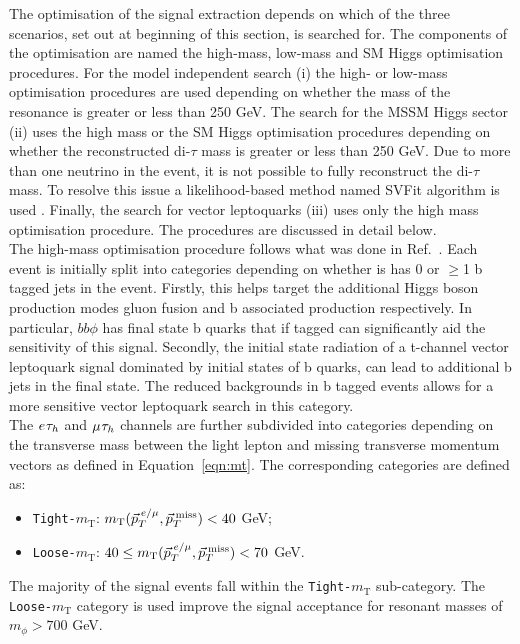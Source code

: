The optimisation of the signal extraction depends on which of the three scenarios, set out at beginning of this section, is searched for.
The components of the optimisation are named the high-mass, low-mass and SM Higgs optimisation procedures.
For the model independent search (i) the high- or low-mass optimisation procedures are used depending on whether the mass of the resonance is greater or less than 250 GeV.
The search for the MSSM Higgs sector (ii) uses the high mass or the SM Higgs optimisation procedures depending on whether the reconstructed di-$\tau$ mass is greater or less than 250 GeV.
Due to more than one neutrino in the event, it is not possible to fully reconstruct the di-$\tau$ mass.
To resolve this issue a likelihood-based method named SVFit algorithm is used \cite{Bianchini:2014vza}.
Finally, the search for vector leptoquarks (iii) uses only the high mass optimisation procedure.
The procedures are discussed in detail below. \\

The high-mass optimisation procedure follows what was done in Ref.~\cite{CMS_MSSM_Tau_2018}.
Each event is initially split into categories depending on whether is has 0 or $\geq$1 b tagged jets in the event.
Firstly, this helps target the additional Higgs boson production modes gluon fusion and b associated production respectively.
In particular, $bb\phi$ has final state b quarks that if tagged can significantly aid the sensitivity of this signal.
Secondly, the initial state radiation of a t-channel vector leptoquark signal dominated by initial states of b quarks, can lead to additional b jets in the final state.
The reduced backgrounds in b tagged events allows for a more sensitive vector leptoquark search in this category. \\

The $e_{}\tau_{h}$ and $\mu_{}\tau_{h}$ channels are further subdivided into categories depending on the transverse mass between the light lepton and missing transverse momentum vectors as defined in Equation~\ref{eqn:mt}.
The corresponding categories are defined as:
\begin{itemize}
\item \texttt{Tight-$m_{\text{T}}$}: $m_{\text{T}}(\vec{p}_{T}^{\hspace{2pt}e/\mu},\vec{p}_{T}^{\hspace{2pt}\text{miss}}) < 40$ GeV;
\item \texttt{Loose-$m_{\text{T}}$}: $40 \leq m_{\text{T}}(\vec{p}_{T}^{\hspace{2pt}e/\mu},\vec{p}_{T}^{\hspace{2pt}\text{miss}}) < 70$ GeV.
\end{itemize}
The majority of the signal events fall within the \texttt{Tight-$m_{\text{T}}$} sub-category.
The \texttt{Loose-$m_{\text{T}}$} category is used improve the signal acceptance for resonant masses of $m_{\phi} > 700$ GeV.\\


